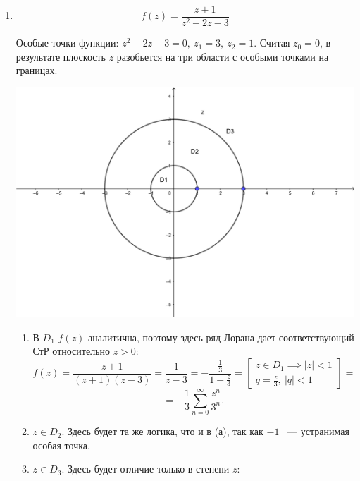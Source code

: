 \documentclass[../../main.tex]{subfiles}
\begin{document}
\begin{exmps}
	
	\;
	
	\begin{enumerate}
		\item \[ f(z) = \frac{z + 1}{z^2 - 2z - 3} \]
		
		Особые точки функции: $ z^2 - 2z - 3 = 0, \ z_1 = 3,\ z_2 = 1 $.
		Считая $ z_0 = 0 $, в результате плоскость $z$ разобьется на три области с 
		особыми точками на границах.
		
		\begin{center}
			\includegraphics[scale = 0.85]{lec34_1} 
		\end{center}
		
		\begin{enumerate}
			\item В $ D_1 $ $ f(z) $ аналитична, поэтому здесь ряд Лорана дает 
			соответствующий СтР относительно $ z > 0 $:
			\[ f(z) = \frac{z + 1}{(z + 1)(z - 3)} = \frac{1}{z - 3} = 
			-\frac{\frac{1}{3}}{1 - \frac{z}{3}} = \left[
			\begin{array}{l}
			z \in D_1 \implies |z| < 1\\
			q = \frac{z}{3},\ |q| < 1
			\end{array}
			\right] = \]
			\[ = -\frac{1}{3} \sum\limits_{n = 0}^{\infty} \frac{z^n}{3^n}. \]
			
			\item $ z \in D_2 $. Здесь будет та же логика, что и в (а), так как $ -1 $ 
			~--- устранимая особая точка.
			
			\item $ z \in D_3 $. Здесь будет отличие только в степени $z$:
			

\end{enumerate}
\end{enumerate}
\end{exmps}
\end{document}
